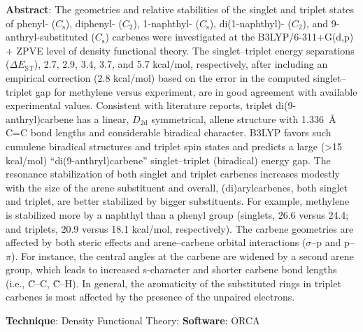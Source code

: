 \documentclass[10pt]{article}
\begin{document}
\begin{enumerate}
          \textbf{Abstract}: The geometries and relative stabilities of the singlet and triplet states of phenyl- (\(C_\mathrm{s}\)), diphenyl- (\(C_2\)), 1-naphthyl- (\(C_\mathrm{s}\)), di(1-naphthyl)- (\(C_2\)), and 9-anthryl-substituted (\(C_\mathrm{s}\)) carbenes were investigated at the B3LYP/6-311+G(d,p) + ZPVE level of density functional theory. The singlet--triplet energy separations (\(\Delta E_\mathrm{ST}\)), 2.7, 2.9, 3.4, 3.7, and 5.7 kcal/mol, respectively, after including an empirical correction (2.8 kcal/mol) based on the error in the computed singlet--triplet gap for methylene versus experiment, are in good agreement with available experimental values. Consistent with literature reports, triplet di(9-anthryl)carbene has a linear, \(D_\mathrm{2d}\) symmetrical, allene structure with \SI{1.336}{\angstrom} C=C bond lengths and considerable biradical character. B3LYP favors such cumulene biradical structures and triplet spin states and predicts a large (>15 kcal/mol) “di(9-anthryl)carbene” singlet--triplet (biradical) energy gap. The resonance stabilization of both singlet and triplet carbenes increases modestly with the size of the arene substituent and overall, (di)arylcarbenes, both singlet and triplet, are better stabilized by bigger substituents. For example, methylene is stabilized more by a naphthyl than a phenyl group (singlets, 26.6 versus 24.4; and triplets, 20.9 versus 18.1 kcal/mol, respectively). The carbene geometries are affected by both steric effects and arene--carbene orbital interactions (\(\sigma\)--p and p--\(\pi\)). For instance, the central angles at the carbene are widened by a second arene group, which leads to increased s-character and shorter carbene bond lengths (i.e., \"{C}--C, \"{C}--H). In general, the aromaticity of the substituted rings in triplet carbenes is most affected by the presence of the unpaired electrons.

          \textbf{Technique}: Density Functional Theory; \textbf{Software}: ORCA

\end{enumerate}
\end{document}
